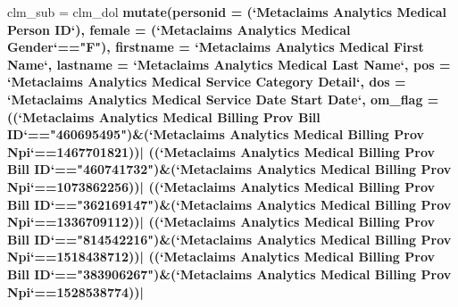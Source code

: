 \documentclass[]{article}
\newenvironment{Shaded}{\begin{snugshade}}{\end{snugshade}}
\newcommand{\KeywordTok}[1]{\textcolor[rgb]{0.13,0.29,0.53}{\textbf{#1}}}
\newcommand{\DataTypeTok}[1]{\textcolor[rgb]{0.13,0.29,0.53}{#1}}
\newcommand{\DecValTok}[1]{\textcolor[rgb]{0.00,0.00,0.81}{#1}}
\newcommand{\StringTok}[1]{\textcolor[rgb]{0.31,0.60,0.02}{#1}}
\newcommand{\OperatorTok}[1]{\textcolor[rgb]{0.81,0.36,0.00}{\textbf{#1}}}
\newcommand{\NormalTok}[1]{#1}
\begin{document}
\begin{Shaded}
\begin{Highlighting}[]
\NormalTok{clm_sub =}\StringTok{ }\NormalTok{clm_dol }\OperatorTok{%>%}
\StringTok{  }\KeywordTok{mutate}\NormalTok{(}\DataTypeTok{personid =}\NormalTok{ (}\StringTok{`}\DataTypeTok{Metaclaims Analytics Medical Person ID}\StringTok{`}\NormalTok{),}
         \DataTypeTok{female =}\NormalTok{ (}\StringTok{`}\DataTypeTok{Metaclaims Analytics Medical Gender}\StringTok{`}\OperatorTok{==}\StringTok{"F"}\NormalTok{),}
         \DataTypeTok{firstname =} \StringTok{`}\DataTypeTok{Metaclaims Analytics Medical First Name}\StringTok{`}\NormalTok{,}
         \DataTypeTok{lastname =} \StringTok{`}\DataTypeTok{Metaclaims Analytics Medical Last Name}\StringTok{`}\NormalTok{,}
         \DataTypeTok{pos =} \StringTok{`}\DataTypeTok{Metaclaims Analytics Medical Service Category Detail}\StringTok{`}\NormalTok{,}
         \DataTypeTok{dos =} \StringTok{`}\DataTypeTok{Metaclaims Analytics Medical Service Date Start Date}\StringTok{`}\NormalTok{,}
         \DataTypeTok{om_flag =}\NormalTok{ ((}\StringTok{`}\DataTypeTok{Metaclaims Analytics Medical Billing Prov Bill ID}\StringTok{`}\OperatorTok{==}\StringTok{"460695495"}\NormalTok{)}\OperatorTok{&}\NormalTok{(}\StringTok{`}\DataTypeTok{Metaclaims Analytics Medical Billing Prov Npi}\StringTok{`}\OperatorTok{==}\DecValTok{1467701821}\NormalTok{))}\OperatorTok{|}
\StringTok{                   }\NormalTok{((}\StringTok{`}\DataTypeTok{Metaclaims Analytics Medical Billing Prov Bill ID}\StringTok{`}\OperatorTok{==}\StringTok{"460741732"}\NormalTok{)}\OperatorTok{&}\NormalTok{(}\StringTok{`}\DataTypeTok{Metaclaims Analytics Medical Billing Prov Npi}\StringTok{`}\OperatorTok{==}\DecValTok{1073862256}\NormalTok{))}\OperatorTok{|}
\StringTok{                   }\NormalTok{((}\StringTok{`}\DataTypeTok{Metaclaims Analytics Medical Billing Prov Bill ID}\StringTok{`}\OperatorTok{==}\StringTok{"362169147"}\NormalTok{)}\OperatorTok{&}\NormalTok{(}\StringTok{`}\DataTypeTok{Metaclaims Analytics Medical Billing Prov Npi}\StringTok{`}\OperatorTok{==}\DecValTok{1336709112}\NormalTok{))}\OperatorTok{|}
\StringTok{                   }\NormalTok{((}\StringTok{`}\DataTypeTok{Metaclaims Analytics Medical Billing Prov Bill ID}\StringTok{`}\OperatorTok{==}\StringTok{"814542216"}\NormalTok{)}\OperatorTok{&}\NormalTok{(}\StringTok{`}\DataTypeTok{Metaclaims Analytics Medical Billing Prov Npi}\StringTok{`}\OperatorTok{==}\DecValTok{1518438712}\NormalTok{))}\OperatorTok{|}
\StringTok{                   }\NormalTok{((}\StringTok{`}\DataTypeTok{Metaclaims Analytics Medical Billing Prov Bill ID}\StringTok{`}\OperatorTok{==}\StringTok{"383906267"}\NormalTok{)}\OperatorTok{&}\NormalTok{(}\StringTok{`}\DataTypeTok{Metaclaims Analytics Medical Billing Prov Npi}\StringTok{`}\OperatorTok{==}\DecValTok{1528538774}\NormalTok{))}\OperatorTok{|}
}
\end{Highlighting}
\end{Shaded}
\end{document}
